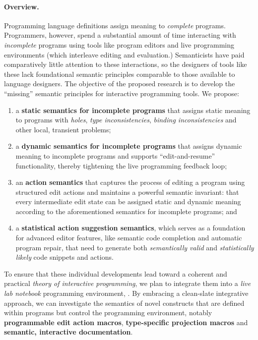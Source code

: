 
\clearpage
\rfoot{}

\paragraph{Overview.}
Programming language definitions assign meaning to \emph{complete} programs. 
Programmers, however, spend a substantial amount of time interacting with \emph{incomplete} programs using tools like program editors and live programming environments (which interleave editing and evaluation.)  
Semanticists have paid comparatively little attention to these interactions, so the designers of tools like these lack foundational semantic principles comparable to those available to language designers. %
The objective of the proposed research is to develop the ``missing'' semantic principles for interactive programming tools. We propose:

\begin{enumerate}[noitemsep,nolistsep,leftmargin=*,align=left]
\item a \textbf{static semantics for incomplete programs} that assigns static meaning to programs with \emph{holes}, \emph{type inconsistencies}, \emph{binding inconsistencies} and other local, transient problems; 
\item a \textbf{dynamic semantics for incomplete programs} that assigns dynamic meaning to incomplete programs and supports ``edit-and-resume'' functionality, thereby tightening the live programming feedback loop;  
\item an \textbf{action semantics} that captures the process of editing a program using structured edit actions and maintains a powerful semantic invariant: that every intermediate edit state can be assigned static and dynamic meaning according to the aforementioned semantics for incomplete programs; and 
\item a \textbf{statistical action suggestion semantics}, which serves as a foundation for advanced editor features, like semantic code completion and automatic program repair, that need to generate both \emph{semantically valid} and \emph{statistically likely} code snippets and actions.
\end{enumerate}

To ensure that these individual developments lead toward a coherent and practical \emph{theory of interactive programming}, we plan to integrate them into a \emph{live lab notebook} programming environment, \HazelEnv. By embracing a clean-slate integrative approach, we can investigate the semantics of novel constructs that are defined within programs but control the programming environment, notably \textbf{programmable edit action macros}, \textbf{type-specific projection macros} and \textbf{semantic, interactive documentation}.

